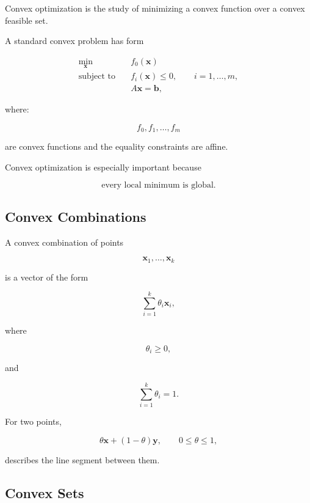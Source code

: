 Convex optimization is the study of minimizing a convex function over a
convex feasible set.

A standard convex problem has form

\[
\boxed{
\begin{aligned}
\min_{\mathbf{x}}
\quad&
f_0(\mathbf{x})
\\
\text{subject to}
\quad&
f_i(\mathbf{x})\leq0,
\qquad
i=1,\ldots,m,
\\
&
A\mathbf{x}=\mathbf{b},
\end{aligned}
}
\]

where:

\[
f_0,f_1,\ldots,f_m
\]

are convex functions and the equality constraints are affine.

Convex optimization is especially important because

\[
\boxed{
\text{every local minimum is global}.
}
\]

\subsection{Convex Combinations}
\label{subsec:convex-combinations}

A convex combination of points

\[
\mathbf{x}_1,\ldots,\mathbf{x}_k
\]

is a vector of the form

\[
\boxed{
\sum_{i=1}^{k}
\theta_i\mathbf{x}_i,
}
\]

where

\[
\boxed{
\theta_i\geq0,
}
\]

and

\[
\boxed{
\sum_{i=1}^{k}
\theta_i=1.
}
\]

For two points,

\[
\boxed{
\theta\mathbf{x}
+
(1-\theta)\mathbf{y},
\qquad
0\leq\theta\leq1,
}
\]

describes the line segment between them.

\subsection{Convex Sets}
\label{subsec:convex-sets-convex-optimization}

